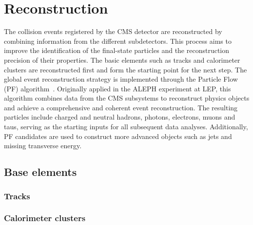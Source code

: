 \chapter{Reconstruction}
\label{sec:reconstruction}
The collision events registered by the CMS detector are reconstructed by combining information from the different subdetectors.
This process aims to improve the identification of the final-state particles and the reconstruction precision of their properties.
The basic elements such as tracks and calorimeter clusters are reconstructed first and form the starting point for the next step.
The global event reconstruction strategy is implemented through the Particle Flow (PF) algorithm~\cite{CMS-PRF-14-001}.
Originally applied in the ALEPH experiment at LEP, this algorithm combines data from the CMS subsystems to reconstruct physics objects and achieve a comprehensive and coherent event reconstruction.
The resulting particles include charged and neutral hadrons, photons, electrons, muons and taus, serving as the starting inputs for all subsequent data analyses.
Additionally, PF candidates are used to construct more advanced objects such as jets and missing transverse energy.



\section{Base elements}
\subsection{Tracks}
\label{sec:tracks}


\subsection{Calorimeter clusters}


